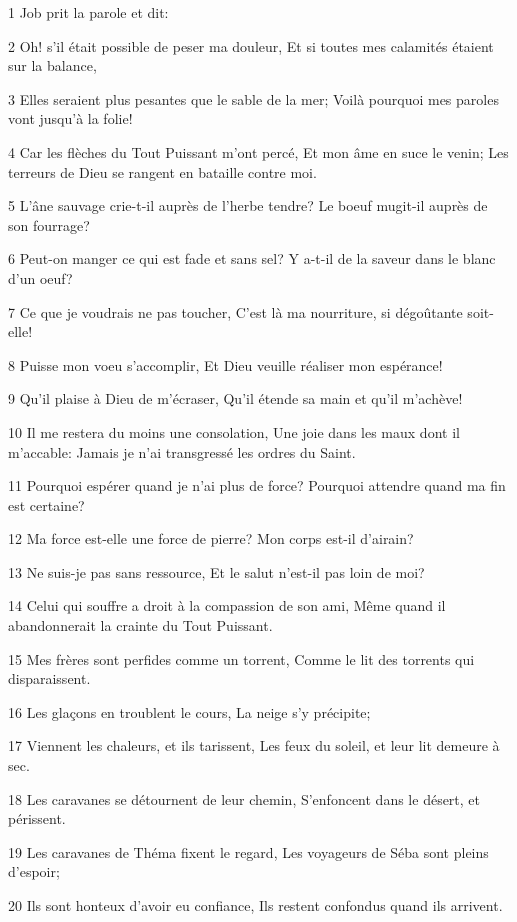 \par 1 Job prit la parole et dit:
\par 2 Oh! s'il était possible de peser ma douleur, Et si toutes mes calamités étaient sur la balance,
\par 3 Elles seraient plus pesantes que le sable de la mer; Voilà pourquoi mes paroles vont jusqu'à la folie!
\par 4 Car les flèches du Tout Puissant m'ont percé, Et mon âme en suce le venin; Les terreurs de Dieu se rangent en bataille contre moi.
\par 5 L'âne sauvage crie-t-il auprès de l'herbe tendre? Le boeuf mugit-il auprès de son fourrage?
\par 6 Peut-on manger ce qui est fade et sans sel? Y a-t-il de la saveur dans le blanc d'un oeuf?
\par 7 Ce que je voudrais ne pas toucher, C'est là ma nourriture, si dégoûtante soit-elle!
\par 8 Puisse mon voeu s'accomplir, Et Dieu veuille réaliser mon espérance!
\par 9 Qu'il plaise à Dieu de m'écraser, Qu'il étende sa main et qu'il m'achève!
\par 10 Il me restera du moins une consolation, Une joie dans les maux dont il m'accable: Jamais je n'ai transgressé les ordres du Saint.
\par 11 Pourquoi espérer quand je n'ai plus de force? Pourquoi attendre quand ma fin est certaine?
\par 12 Ma force est-elle une force de pierre? Mon corps est-il d'airain?
\par 13 Ne suis-je pas sans ressource, Et le salut n'est-il pas loin de moi?
\par 14 Celui qui souffre a droit à la compassion de son ami, Même quand il abandonnerait la crainte du Tout Puissant.
\par 15 Mes frères sont perfides comme un torrent, Comme le lit des torrents qui disparaissent.
\par 16 Les glaçons en troublent le cours, La neige s'y précipite;
\par 17 Viennent les chaleurs, et ils tarissent, Les feux du soleil, et leur lit demeure à sec.
\par 18 Les caravanes se détournent de leur chemin, S'enfoncent dans le désert, et périssent.
\par 19 Les caravanes de Théma fixent le regard, Les voyageurs de Séba sont pleins d'espoir;
\par 20 Ils sont honteux d'avoir eu confiance, Ils restent confondus quand ils arrivent.
